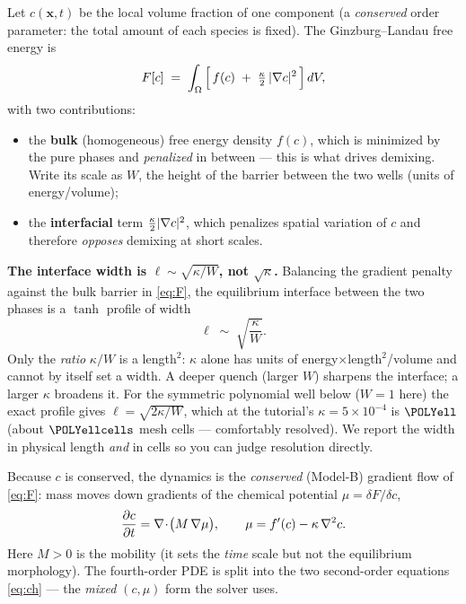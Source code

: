 Let $c(\mathbf{x},t)$ be the local volume fraction of one component (a
\emph{conserved} order parameter: the total amount of each species is
fixed). The Ginzburg--Landau free energy is
%
\begin{equation}
  F[c] \;=\; \int_\Omega \Big[\, f(c) \;+\; \tfrac{\kappa}{2}\,|\nabla c|^2 \,\Big]\,dV ,
  \label{eq:F}
\end{equation}
%
with two contributions:
\begin{itemize}[nosep]
  \item the \textbf{bulk} (homogeneous) free energy density $f(c)$,
        which is minimized by the pure phases and \emph{penalized} in
        between --- this is what drives demixing. Write its scale as
        $W$, the height of the barrier between the two wells (units of
        energy/volume);
  \item the \textbf{interfacial} term $\tfrac{\kappa}{2}|\nabla c|^2$,
        which penalizes spatial variation of $c$ and therefore
        \emph{opposes} demixing at short scales.
\end{itemize}

\begin{keybox}
\textbf{The interface width is $\ell\sim\sqrt{\kappa/W}$, not
$\sqrt{\kappa}$.} Balancing the gradient penalty against the bulk
barrier in \eqref{eq:F}, the equilibrium interface between the two
phases is a $\tanh$ profile of width
%
\begin{equation}
  \ell \;\sim\; \sqrt{\dfrac{\kappa}{W}} .
  \label{eq:width}
\end{equation}
%
Only the \emph{ratio} $\kappa/W$ is a length$^2$: $\kappa$ alone has
units of energy$\times$length$^2$/volume and cannot by itself set a
width. A deeper quench (larger $W$) sharpens the interface; a larger
$\kappa$ broadens it. For the symmetric polynomial well below
($W=1$ here) the exact profile gives $\ell=\sqrt{2\kappa/W}$, which at
the tutorial's $\kappa=5\times10^{-4}$ is $\POLYell$ (about
$\POLYellcells$ mesh cells --- comfortably resolved). We report the
width in physical length \emph{and} in cells so you can judge
resolution directly.
\end{keybox}

Because $c$ is conserved, the dynamics is the \emph{conserved}
(Model-B) gradient flow of \eqref{eq:F}: mass moves down gradients of
the chemical potential $\mu = \delta F/\delta c$,
%
\begin{equation}
  \frac{\partial c}{\partial t} = \nabla\!\cdot\!\big(M\,\nabla\mu\big),
  \qquad
  \mu = f'(c) - \kappa\,\nabla^2 c .
  \label{eq:ch}
\end{equation}
%
Here $M>0$ is the mobility (it sets the \emph{time} scale but not the
equilibrium morphology). The fourth-order PDE is split into the two
second-order equations \eqref{eq:ch} --- the \emph{mixed} $(c,\mu)$ form
the solver uses.

